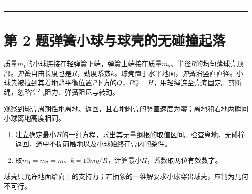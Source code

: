 \documentclass[UTF8,fontset=fandol,a4paper,11pt]{ctexart}
\begin{document}
\par\vspace{5mm}\par\vspace{3mm}\noindent\textcolor{rulegray}{\rule{\linewidth}{0.3pt}}\par\vspace{12mm}\noindent\textcolor{rulegray}{\rule{\linewidth}{0.3pt}}

\clearpage


\section*{第 2 题\quad 弹簧小球与球壳的无碰撞起落}\label{q:2}


质量$m_1$的小球连接在轻弹簧下端，弹簧上端接在质量$m_2$、半径$R$的均匀薄球壳顶部。弹簧自由长度也是$R$，劲度系数$k$。球壳置于水平地面，弹簧沿竖直直径。小球先被拉到其着地静平衡位置$P$下方的$Q$，$PQ=H$，用轻绳连至壳底固定。剪断绳，忽略空气阻力、弹簧阻尼与转动。

观察到球壳周期性地离地、返回，且着地时壳的竖直速度为零；离地和着地两瞬间小球离地高度相同。
\begin{enumerate}
\item 建立确定最小$H$的一组方程，求出其无量纲根的取值区间。检查离地、无碰撞返回、途中不提前触地以及小球始终在壳内的条件。
\item 取$m_1=m_2=m$、$k=10mg/R$，计算最小$H$，系数取两位有效数字。
\end{enumerate}
球壳只允许地面给向上的支持力；若抽象的一维解要求小球穿出球壳，应判为几何不可行。
\end{document}
